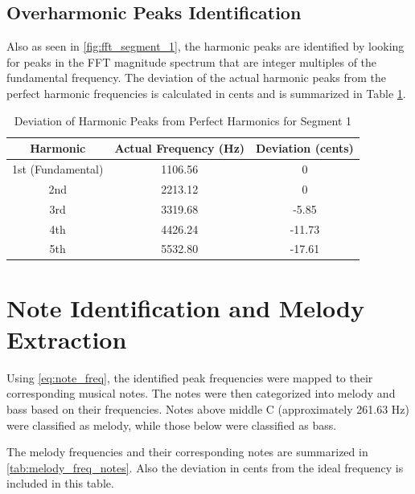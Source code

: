 \subsection{Overharmonic Peaks Identification}

Also as seen in \autoref{fig:fft_segment_1}, the harmonic peaks are identified by looking for peaks in the FFT magnitude spectrum that are integer multiples of the fundamental frequency. The deviation of the actual harmonic peaks from the perfect harmonic frequencies is calculated in cents and is summarized in Table \ref{tab:deviation_segment_1}. 

\begin{table}[H]
    \centering
    \caption{Deviation of Harmonic Peaks from Perfect Harmonics for Segment 1}
    \begin{tabular}{ccc}
        \hline
        Harmonic & Actual Frequency (Hz) & Deviation (cents) \\
        \hline
        1st (Fundamental) & 1106.56 & 0 \\
        2nd & 2213.12 & 0 \\
        3rd & 3319.68 & -5.85 \\
        4th & 4426.24 & -11.73 \\
        5th & 5532.80 & -17.61 \\
        \hline
    \end{tabular}
    \label{tab:deviation_segment_1}
\end{table}


\section{Note Identification and Melody Extraction}

Using \autoref{eq:note_freq}, the identified peak frequencies were mapped to their corresponding musical notes. The notes were then categorized into melody and bass based on their frequencies. Notes above middle C (approximately 261.63 Hz) were classified as melody, while those below were classified as bass.

The melody frequencies and their corresponding notes are summarized in \autoref{tab:melody_freq_notes}. Also the deviation in cents from the ideal frequency is included in this table.

